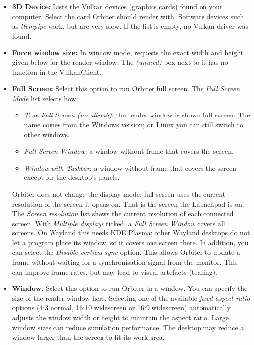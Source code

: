 \documentclass[Orbiter User Manual.tex]{subfiles}
\begin{document}
\begin{itemize}
\item \textbf{3D Device:} Lists the Vulkan devices (graphics cards) found on your computer. Select the card Orbiter should render with. Software devices such as \textit{llvmpipe} work, but are very slow. If the list is empty, no Vulkan driver was found.
\item \textbf{Force window size:} In window mode, requests the exact width and height given below for the render window. The \textit{(unused)} box next to it has no function in the VulkanClient.
\item \textbf{Full Screen:} Select this option to run Orbiter full screen. The \textit{Full Screen Mode} list selects how:
\begin{itemize}
\item \textit{True Full Screen (no alt-tab)}: the render window is shown full screen. The name comes from the Windows version; on Linux you can still switch to other windows.
\item \textit{Full Screen Window}: a window without frame that covers the screen.
\item \textit{Window with Taskbar}: a window without frame that covers the screen except for the desktop's panels.
\end{itemize}
Orbiter does not change the display mode: full screen uses the current resolution of the screen it opens on. That is the screen the Launchpad is on. The \textit{Screen resolution} list shows the current resolution of each connected screen.\newline
With \textit{Multiple displays} ticked, a \textit{Full Screen Window} covers all screens. On Wayland this needs KDE Plasma; other Wayland desktops do not let a program place its window, so it covers one screen there.\newline
In addition, you can select the \textit{Disable vertical sync} option. This allows Orbiter to update a frame without waiting for a synchronisation signal from the monitor. This can improve frame rates, but may lead to visual artefacts (tearing).
\item \textbf{Window:} Select this option to run Orbiter in a window. You can specify the size of the render window here. Selecting one of the available \textit{fixed aspect ratio} options (4:3 normal, 16:10 widescreen or 16:9 widescreen) automatically adjusts the window width or height to maintain the aspect ratio. Large window sizes can reduce simulation performance. The desktop may reduce a window larger than the screen to fit its work area.

\end{itemize}
\end{document}
